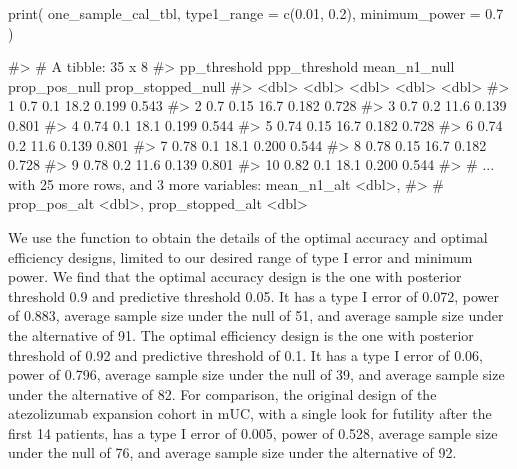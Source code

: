 \begin{Schunk}
\begin{Sinput}
print(
  one_sample_cal_tbl,
  type1_range = c(0.01, 0.2),
  minimum_power = 0.7
  )
\end{Sinput}
\begin{Soutput}
#> # A tibble: 35 x 8
#>    pp_threshold ppp_threshold mean_n1_null prop_pos_null prop_stopped_null
#>           <dbl>         <dbl>        <dbl>         <dbl>             <dbl>
#>  1         0.7           0.1          18.2         0.199             0.543
#>  2         0.7           0.15         16.7         0.182             0.728
#>  3         0.7           0.2          11.6         0.139             0.801
#>  4         0.74          0.1          18.1         0.199             0.544
#>  5         0.74          0.15         16.7         0.182             0.728
#>  6         0.74          0.2          11.6         0.139             0.801
#>  7         0.78          0.1          18.1         0.200             0.544
#>  8         0.78          0.15         16.7         0.182             0.728
#>  9         0.78          0.2          11.6         0.139             0.801
#> 10         0.82          0.1          18.1         0.200             0.544
#> # ... with 25 more rows, and 3 more variables: mean_n1_alt <dbl>,
#> #   prop_pos_alt <dbl>, prop_stopped_alt <dbl>
\end{Soutput}
\end{Schunk}

We use the  function to obtain the details of
the optimal accuracy and optimal efficiency designs, limited to our
desired range of type I error and minimum power. We find that the
optimal accuracy design is the one with posterior threshold 0.9 and
predictive threshold 0.05. It has a type I error of 0.072, power of
0.883, average sample size under the null of 51, and average sample size
under the alternative of 91. The optimal efficiency design is the one
with posterior threshold of 0.92 and predictive threshold of 0.1. It has
a type I error of 0.06, power of 0.796, average sample size under the
null of 39, and average sample size under the alternative of 82. For
comparison, the original design of the atezolizumab expansion cohort in
mUC, with a single look for futility after the first 14 patients, has a
type I error of 0.005, power of 0.528, average sample size under the
null of 76, and average sample size under the alternative of 92.

